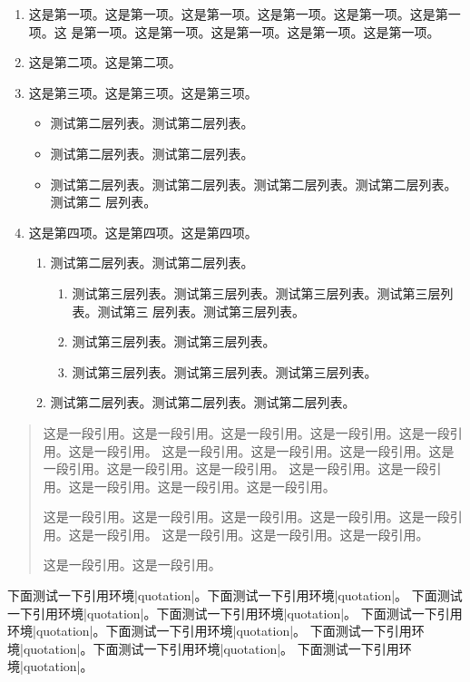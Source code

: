 \begin{enumerate}
\item 这是第一项。这是第一项。这是第一项。这是第一项。这是第一项。这是第一项。这
  是第一项。这是第一项。这是第一项。这是第一项。这是第一项。
\item 这是第二项。这是第二项。
\item 这是第三项。这是第三项。这是第三项。
  \begin{itemize}
  \item 测试第二层列表。测试第二层列表。
  \item 测试第二层列表。测试第二层列表。
  \item 测试第二层列表。测试第二层列表。测试第二层列表。测试第二层列表。测试第二
    层列表。
  \end{itemize}
\item 这是第四项。这是第四项。这是第四项。
  \begin{enumerate}
  \item 测试第二层列表。测试第二层列表。
  \begin{enumerate}
  \item 测试第三层列表。测试第三层列表。测试第三层列表。测试第三层列表。测试第三
    层列表。测试第三层列表。
  \item 测试第三层列表。测试第三层列表。
  \item 测试第三层列表。测试第三层列表。测试第三层列表。
  \end{enumerate}
  \item 测试第二层列表。测试第二层列表。测试第二层列表。
  \end{enumerate}
\end{enumerate}

\begin{quote}
这是一段引用。这是一段引用。这是一段引用。这是一段引用。这是一段引用。这是一段引用。
这是一段引用。这是一段引用。这是一段引用。这是一段引用。这是一段引用。这是一段引用。
这是一段引用。这是一段引用。这是一段引用。这是一段引用。这是一段引用。

这是一段引用。这是一段引用。这是一段引用。这是一段引用。这是一段引用。这是一段引用。
这是一段引用。这是一段引用。这是一段引用。

这是一段引用。这是一段引用。
\end{quote}

下面测试一下引用环境|quotation|。下面测试一下引用环境|quotation|。
下面测试一下引用环境|quotation|。下面测试一下引用环境|quotation|。
下面测试一下引用环境|quotation|。下面测试一下引用环境|quotation|。
下面测试一下引用环境|quotation|。下面测试一下引用环境|quotation|。
下面测试一下引用环境|quotation|。

